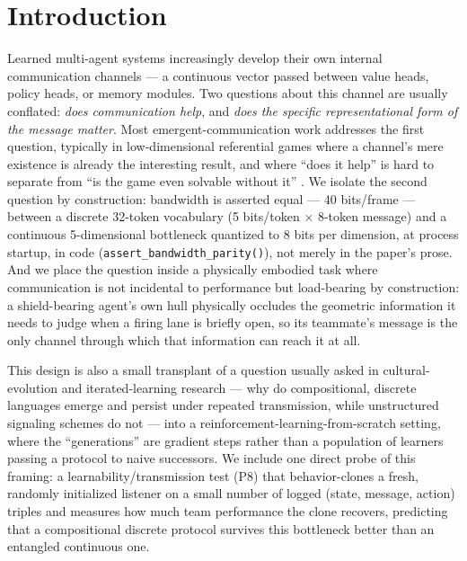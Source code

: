 \documentclass[11pt]{article}
\begin{document}
\section{Introduction}

Learned multi-agent systems increasingly develop their own internal
communication channels --- a continuous vector passed between value heads,
policy heads, or memory modules. Two questions about this channel are
usually conflated: \emph{does communication help}, and \emph{does the
specific representational form of the message matter}. Most
emergent-communication work addresses the first question, typically in
low-dimensional referential games where a channel's mere existence is
already the interesting result, and where ``does it help'' is hard to
separate from ``is the game even solvable without it''
\citep{lazaridou2017,foerster2016,mordatch2018}. We isolate the second
question by construction: bandwidth is asserted equal --- 40 bits/frame
--- between a discrete 32-token vocabulary (5 bits/token $\times$
8-token message) and a continuous 5-dimensional bottleneck quantized to
8 bits per dimension, at process startup, in code
(\texttt{assert\_bandwidth\_parity()}), not merely in the paper's prose.
And we place the question inside a physically embodied task where
communication is not incidental to performance but load-bearing by
construction: a shield-bearing agent's own hull physically occludes the
geometric information it needs to judge when a firing lane is briefly
open, so its teammate's message is the only channel through which that
information can reach it at all.

This design is also a small transplant of a question usually asked in
cultural-evolution and iterated-learning research --- why do
compositional, discrete languages emerge and persist under repeated
transmission, while unstructured signaling schemes do not
\citep{kirby2001,skyrms2010} --- into a
reinforcement-learning-from-scratch setting, where the ``generations''
are gradient steps rather than a population of learners passing a
protocol to naive successors. We include one direct probe of this
framing: a learnability/transmission test (P8) that behavior-clones a
fresh, randomly initialized listener on a small number of logged
(state, message, action) triples and measures how much team performance
the clone recovers, predicting that a compositional discrete protocol
survives this bottleneck better than an entangled continuous one.
\end{document}
